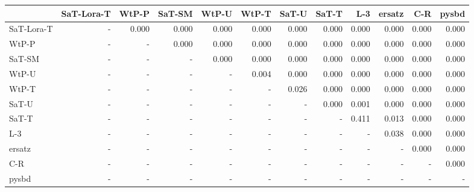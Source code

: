 \begin{tabular}{lrrrrrrrrrrr}
\toprule
 & SaT-Lora-T & WtP-P & SaT-SM & WtP-U & WtP-T & SaT-U & SaT-T & L-3 & ersatz & C-R & pysbd \\
\midrule
SaT-Lora-T & - & 0.000 & 0.000 & 0.000 & 0.000 & 0.000 & 0.000 & 0.000 & 0.000 & 0.000 & 0.000 \\
WtP-P & - & - & 0.000 & 0.000 & 0.000 & 0.000 & 0.000 & 0.000 & 0.000 & 0.000 & 0.000 \\
SaT-SM & - & - & - & 0.000 & 0.000 & 0.000 & 0.000 & 0.000 & 0.000 & 0.000 & 0.000 \\
WtP-U & - & - & - & - & 0.004 & 0.000 & 0.000 & 0.000 & 0.000 & 0.000 & 0.000 \\
WtP-T & - & - & - & - & - & 0.026 & 0.000 & 0.000 & 0.000 & 0.000 & 0.000 \\
SaT-U & - & - & - & - & - & - & 0.000 & 0.001 & 0.000 & 0.000 & 0.000 \\
SaT-T & - & - & - & - & - & - & - & 0.411 & 0.013 & 0.000 & 0.000 \\
L-3 & - & - & - & - & - & - & - & - & 0.038 & 0.000 & 0.000 \\
ersatz & - & - & - & - & - & - & - & - & - & 0.000 & 0.000 \\
C-R & - & - & - & - & - & - & - & - & - & - & 0.000 \\
pysbd & - & - & - & - & - & - & - & - & - & - & - \\
\bottomrule
\end{tabular}

